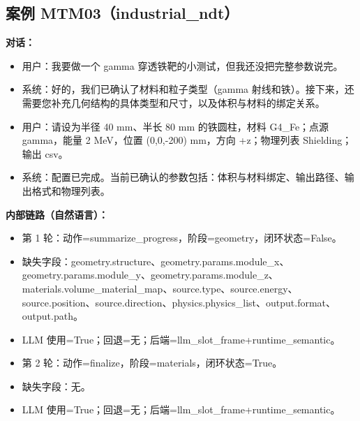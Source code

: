 \documentclass[11pt]{ctexart}
\begin{document}
\subsection{案例 MTM03（industrial\_ndt）}
\textbf{对话：}
\begin{itemize}
\item 用户：我要做一个 gamma 穿透铁靶的小测试，但我还没把完整参数说完。
\item 系统：好的，我们已确认了材料和粒子类型（gamma 射线和铁）。接下来，还需要您补充几何结构的具体类型和尺寸，以及体积与材料的绑定关系。
\item 用户：请设为半径 40 mm、半长 80 mm 的铁圆柱，材料 G4\_Fe；点源 gamma，能量 2 MeV，位置 (0,0,-200) mm，方向 +z；物理列表 Shielding；输出 csv。
\item 系统：配置已完成。当前已确认的参数包括：体积与材料绑定、输出路径、输出格式和物理列表。
\end{itemize}
\textbf{内部链路（自然语言）：}
\begin{itemize}
\item 第 1 轮：动作=summarize\_progress，阶段=geometry，闭环状态=False。
\item 缺失字段：geometry.structure、geometry.params.module\_x、geometry.params.module\_y、geometry.params.module\_z、materials.volume\_material\_map、source.type、source.energy、source.position、source.direction、physics.physics\_list、output.format、output.path。
\item LLM 使用=True；回退=无；后端=llm\_slot\_frame+runtime\_semantic。
\item 第 2 轮：动作=finalize，阶段=materials，闭环状态=True。
\item 缺失字段：无。
\item LLM 使用=True；回退=无；后端=llm\_slot\_frame+runtime\_semantic。
\end{itemize}
\end{document}

